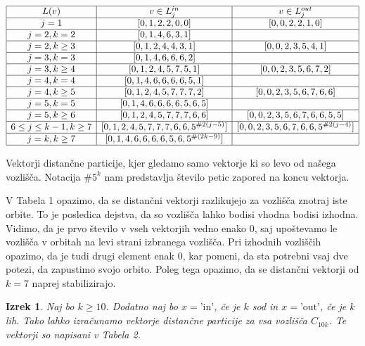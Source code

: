 \documentclass[a4paper, 12pt]{article}
\newtheorem{izrek}{Izrek}[section]
\begin{document}
\begin{table}
\centering
$\begin{array}{ |c|c|c| }
    \hline
    L(v) & v \in L_j^{in} & v \in L_j^{out}  \\
    \hline
    j = 1 & [0, 1, 2, 2, 0, 0] & [0, 0, 2, 2, 1, 0] \\
    \hline
    j = 2, k = 2 & [0, 1, 4, 6, 3, 1] &  \\
    \hline
    j = 2, k \geq 3 & [0, 1, 2, 4, 4, 3, 1] & [0, 0, 2, 3, 5, 4, 1] \\
    \hline
    j = 3, k = 3 & [0, 1, 4, 6, 6, 6, 2] & \\
    \hline
    j = 3, k \geq 4 & [0, 1, 2, 4, 5, 7, 5, 1] & [0, 0, 2, 3, 5, 6, 7, 2] \\
    \hline
    j = 4, k = 4 & [0, 1, 4, 6, 6, 6, 6, 5, 1] & \\
    \hline
    j = 4, k \geq 5 & [0, 1, 2, 4, 5, 7, 7, 7, 2] & [0, 0, 2, 3, 5, 6, 7, 6, 6] \\
    \hline
    j = 5, k = 5 & [0, 1, 4, 6, 6, 6, 6, 5, 6, 5] & \\
    \hline
    j = 5, k \geq 6 & [0, 1, 2, 4, 5, 7, 7, 7, 6, 6] & [0, 0, 2, 3, 5, 6, 7, 6, 6, 5, 5]\\
    \hline
    6 \leq j \leq k-1, k \geq 7 & [0, 1, 2, 4, 5, 7, 7, 7, 6, 6, 5^{\#2(j-5)}] & [0, 0, 2, 3, 5, 6, 7, 6, 6, 5^{\#2(j-4)}]\\
    \hline
    j = k, k \geq 7 & [0, 1, 4, 6, 6, 6, 6, 5, 6, 5^{\#(2k - 9)}] & \\
    \hline
\end{array}$
\caption{Vektorji distančne particije, kjer gledamo samo vektorje ki so levo od našega vozlišča. Notacija $\#5^k$ nam predstavlja število petic zapored na koncu vektorja.}
\end{table}

V Tabela 1 opazimo, da se distančni vektorji razlikujejo za vozlišča znotraj iste orbite. To je posledica dejstva, da so vozlišča lahko bodisi vhodna bodisi izhodna. Vidimo, da je prvo število v vseh vektorjih vedno enako $0$, 
saj upoštevamo le vozlišča v orbitah na levi strani izbranega vozlišča. Pri izhodnih vozliščih opazimo, da je tudi drugi element enak $0$, kar pomeni, da sta potrebni vsaj dve potezi, da zapustimo svojo orbito. Poleg tega opazimo, 
da se distančni vektorji od $k=7$ naprej stabilizirajo.


\begin{izrek}
Naj bo $k \geq 10$. Dodatno naj bo $x = \text{'in'}$, če je $k$ sod in $x = \text{'out'}$, če je $k$ lih. Tako lahko izračunamo vektorje distančne 
particije za vsa vozlišča $C_{10k}$. Te vektorji so napisani v Tabela 2.
\end{izrek}
\end{document}
